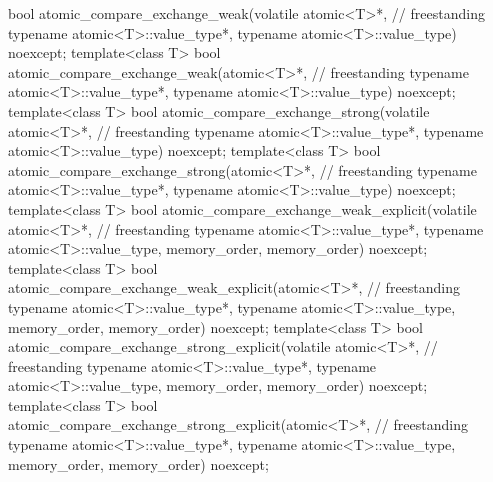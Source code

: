 \begin{codeblock}
{    bool atomic_compare_exchange_weak(volatile atomic<T>*,                          // freestanding
                                      typename atomic<T>::value_type*,
                                      typename atomic<T>::value_type) noexcept;
  template<class T>
    bool atomic_compare_exchange_weak(atomic<T>*,                                   // freestanding
                                      typename atomic<T>::value_type*,
                                      typename atomic<T>::value_type) noexcept;
  template<class T>
    bool atomic_compare_exchange_strong(volatile atomic<T>*,                        // freestanding
                                        typename atomic<T>::value_type*,
                                        typename atomic<T>::value_type) noexcept;
  template<class T>
    bool atomic_compare_exchange_strong(atomic<T>*,                                 // freestanding
                                        typename atomic<T>::value_type*,
                                        typename atomic<T>::value_type) noexcept;
  template<class T>
    bool atomic_compare_exchange_weak_explicit(volatile atomic<T>*,                 // freestanding
                                               typename atomic<T>::value_type*,
                                               typename atomic<T>::value_type,
                                               memory_order, memory_order) noexcept;
  template<class T>
    bool atomic_compare_exchange_weak_explicit(atomic<T>*,                          // freestanding
                                               typename atomic<T>::value_type*,
                                               typename atomic<T>::value_type,
                                               memory_order, memory_order) noexcept;
  template<class T>
    bool atomic_compare_exchange_strong_explicit(volatile atomic<T>*,               // freestanding
                                                 typename atomic<T>::value_type*,
                                                 typename atomic<T>::value_type,
                                                 memory_order, memory_order) noexcept;
  template<class T>
    bool atomic_compare_exchange_strong_explicit(atomic<T>*,                        // freestanding
                                                 typename atomic<T>::value_type*,
                                                 typename atomic<T>::value_type,
                                                 memory_order, memory_order) noexcept;

}
\end{codeblock}

